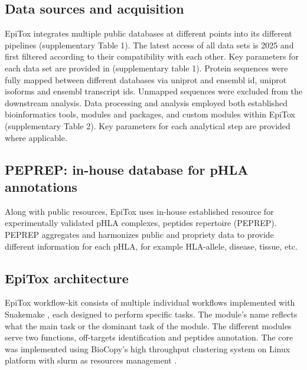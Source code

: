 \documentclass[unnumsec,webpdf,contemporary,large]{oup-authoring-template}%
\theoremstyle{thmstyleone}%
\theoremstyle{thmstyletwo}%
\theoremstyle{thmstylethree}%
\begin{document}
    \subsection{Data sources and acquisition}
        EpiTox integrates multiple public databases at different points into its different pipelines (supplementary Table 1). The latest access of all data sets is 2025 and first filtered according to their compatibility with each other. Key parameters for each data set are provided in (supplementary table 1). Protein sequences were fully mapped between different databases via uniprot and ensembl id, uniprot isoforms and ensembl transcript ids. Unmapped sequences were excluded from the downstream analysis. Data processing and analysis employed both established bioinformatics tools, modules and packages, and custom modules within EpiTox (supplementary Table 2). Key parameters for each analytical step are provided where applicable. 
        
    \subsection{\textbf{PEPREP: in-house database for pHLA annotations}}
        Along with public resources, EpiTox uses in-house established resource for experimentally validated pHLA complexes, peptides repertoire (PEPREP). PEPREP aggregates and harmonizes public and propriety data to provide different information for each pHLA, for example HLA-allele, disease, tissue, etc.

    \subsection{\textbf{EpiTox architecture}}
        EpiTox workflow-kit consists of multiple individual workflows implemented with Snakemake \cite{molder2025sustainable}, each designed to perform specific tasks. The module's name reflects what the main task or the dominant task of the module. The different modules serve two functions, off-targets identification and peptides annotation. The core was implemented using BioCopy's high throughput clustering system on Linux platform with slurm as resources management \cite{simakov2018slurm}.
        
\end{document}
